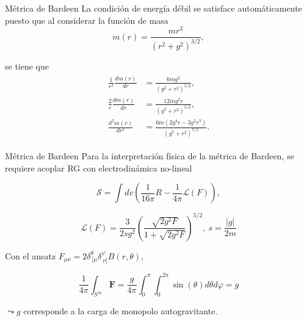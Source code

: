 \documentclass[t]{beamer}
\numberwithin{equation}{section}
\begin{document}
\begin{frame}{Métrica de Bardeen}
La condición de energía débil se satisface automáticamente puesto que al considerar la función de masa
\begin{equation}
m(r) = \frac{mr^3}{(r^2 + g^2)^{3/2}},
\end{equation}

se tiene que
\begin{align}
\begin{aligned}
\frac{1}{r^2}\frac{dm(r)}{dr} &= \frac{6 m g^2}{\left(g^2+r^2\right)^{5/2}},\\
\frac{2}{r}\frac{dm(r)}{dr} &= \frac{12 m g^2 r}{\left(g^2+r^2\right)^{5/2}},\\
\frac{d^2m(r)}{dr^2} &= \frac{6 m \left(2 g^4 r-3 g^2 r^3\right)}{\left(g^2+r^2\right)^{7/2}}.
\end{aligned}
\end{align}
\end{frame}

\begin{frame}{Métrica de Bardeen}
Para la interpretación física de la métrica de Bardeen, se requiere acoplar RG con electrodinámica no-lineal \cite{ayon-beato2000}

\begin{equation}
\mathcal{S} = \int dv \left( \frac{1}{16 \pi}R - \frac{1}{4 \pi}\mathcal{L}(F) \right),
\end{equation}

\begin{equation}
\label{nonlinear bardeen}
\mathcal{L}(F) = \frac{3}{2sg^2}\left( \frac{\sqrt{2g^2F}}{1 + \sqrt{2g^2F}} \right)^{5/2},\ s = \frac{|g|}{2m}
\end{equation}

Con el ansatz $F_{\mu \nu} = 2 \delta^{\theta}_{\ \lbrack\mu} \delta^{\varphi}_{\ \nu\rbrack} B(r, \theta)
$,

\begin{equation*}
\frac{1}{4 \pi} \int_{S^{\infty}}\mathbf{F} = \frac{g}{4 \pi} \int_{0}^{\pi}\int_{0}^{2\pi}\sin (\theta) d\theta d\varphi = g
\end{equation*}

$ \leadsto g$ corresponde a la carga de monopolo autogravitante.
\end{frame}
\end{document}
